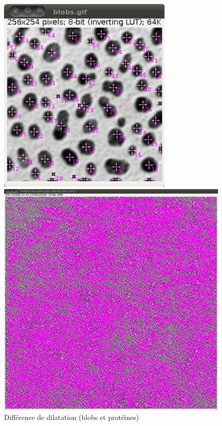 \begin{figure}[!ht]
\begin{center}
 \begin{minipage}{.450\linewidth}
  \includegraphics[width=0.75\textwidth]{blobDilate.png}  
 \end{minipage} \hfill
\begin{minipage}{.450\linewidth}
  \includegraphics[width=1\textwidth]{protDilate.png}   
 \end{minipage} \hfill
\caption{Différence de dilatation (blobs et protéines)}
\end{center}
\end{figure}


